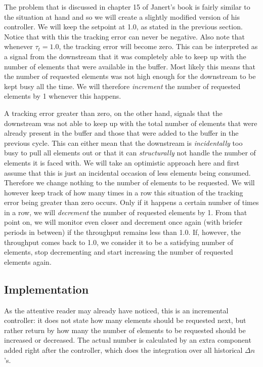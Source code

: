 The problem that is discussed in chapter 15 of Janert's book is fairly similar to the situation at hand and so we will create a slightly modified version of his controller. We will keep the setpoint at 1.0, as stated in the previous section. Notice that with this the tracking error can never be negative. Also note that whenever $\tau_t = 1.0$, the tracking error will become zero. This can be interpreted as a signal from the downstream that it was completely able to keep up with the number of elements that were available in the buffer. Most likely this means that the number of requested elements was not high enough for the downstream to be kept busy all the time. We will therefore \textit{increment} the number of requested elements by 1 whenever this happens.

A tracking error greater than zero, on the other hand, signals that the downstream was not able to keep up with the total number of elements that were already present in the buffer and those that were added to the buffer in the previous cycle. This can either mean that the downstream is \emph{incidentally} too busy to pull all elements out or that it can \emph{structurally} not handle the number of elements it is faced with. We will take an optimistic approach here and first assume that this is just an incidental occasion of less elements being consumed. Therefore we change nothing to the number of elements to be requested. We will however keep track of how many times in a row this situation of the tracking error being greater than zero occurs. Only if it happens a certain number of times in a row, we will \textit{decrement} the number of requested elements by 1. From that point on, we will monitor even closer and decrement once again (with briefer periods in between) if the throughput remains less than 1.0. If, however, the throughput comes back to 1.0, we consider it to be a satisfying number of elements, stop decrementing and start increasing the number of requested elements again.

\subsection*{Implementation}
As the attentive reader may already have noticed, this is an incremental controller: it does not state how many elements should be requested next, but rather return by how many the number of elements to be requested should be increased or decreased. The actual number is calculated by an extra component added right after the controller, which does the integration over all historical $\Delta n$'s.

